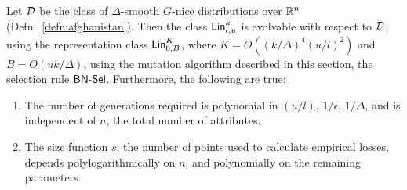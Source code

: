 \begin{theorem} Let ${\mathcal D}$ be the class of $\Delta$-smooth $G$-nice
distributions over $\mathbb{R}^n$ (Defn.~\ref{defn:afghanistan}). Then the
class $\mathsf{Lin}^k_{l, u}$ is evolvable with respect to ${\mathcal D}$, using the
representation class $\mathsf{Lin}^K_{0, B}$, where $K = O((k/\Delta)^4 (u/l)^2)$ and $B
= O(uk/\Delta)$, using the mutation algorithm described in this section, the
selection rule $\mathsf{BN\mbox{-}Sel}$.  Furthermore, the following are true:
\begin{enumerate}
%
\item The number of generations required is polynomial in $(u/l)$, $1/\epsilon$,
$1/\Delta$, and is independent of $n$, the total number of attributes. 
%
\item The size function $s$, the number of points used to calculate empirical
losses, depends polylogarithmically on $n$, and
polynomially on the remaining parameters. 
%
\end{enumerate}
\label{thm:sparse_linear} \end{theorem}
